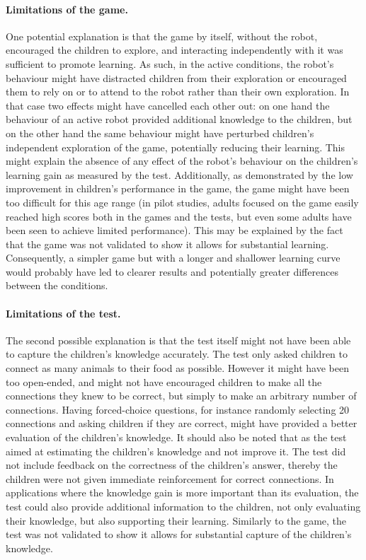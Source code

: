 \paragraph{Limitations of the game.} 
One potential explanation is that the game by itself, without the robot, encouraged the children to explore, and interacting independently with it was sufficient to promote learning. As such, in the active conditions, the robot's behaviour might have distracted children from their exploration or encouraged them to rely on or to attend to the robot rather than their own exploration. In that case two effects might have cancelled each other out: on one hand the behaviour of an active robot provided additional knowledge to the children, but on the other hand the same behaviour might have perturbed children's independent exploration of the game, potentially reducing their learning. This might explain the absence of any effect of the robot's behaviour on the children's learning gain as measured by the test. Additionally, as demonstrated by the low improvement in children's performance in the game, the game might have been too difficult for this age range (in pilot studies, adults focused on the game easily reached high scores both in the games and the tests, but even some adults have been seen to achieve limited performance). This may be explained by the fact that the game was not validated to show it allows for substantial learning. Consequently, a simpler game but with a longer and shallower learning curve would probably have led to clearer results and potentially greater differences between the conditions. 

\paragraph{Limitations of the test.} 
The second possible explanation is that the test itself might not have been able to capture the children's knowledge accurately. The test only asked children to connect as many animals to their food as possible. However it might have been too open-ended, and might not have encouraged children to make all the connections they knew to be correct, but simply to make an arbitrary number of connections. 
Having forced-choice questions, for instance randomly selecting 20 connections and asking children if they are correct, might have provided a better evaluation of the children's knowledge. It should also be noted that as the test aimed at estimating the children's knowledge and not improve it. The test did not include feedback on the correctness of the children's answer, thereby the children were not given immediate reinforcement for correct connections. In applications where the knowledge gain is more important than its evaluation, the test could also provide additional information to the children, not only evaluating their knowledge, but also supporting their learning. Similarly to the game, the test was not validated to show it allows for substantial capture of the children's knowledge.

